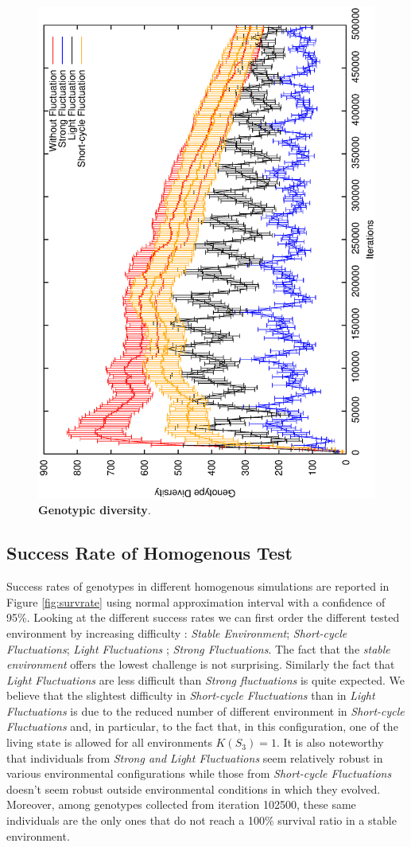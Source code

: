 \begin{figure}[h]
\centering
\includegraphics[width=0.7\columnwidth, angle =-90 ]{img/GenoDiversity}
\caption{\textbf{Genotypic diversity}.}
\label{fig:genodiv}
\end{figure}

\subsection{Success Rate of Homogenous Test}
Success rates of genotypes in different homogenous simulations are reported in Figure \ref{fig:survrate} using normal approximation interval with a confidence of 95\%. Looking at the different success rates we can first order the different tested environment by increasing difficulty : \emph{Stable Environment}; \emph{Short-cycle Fluctuations}; \emph{Light Fluctuations} ; \emph{Strong Fluctuations}. The fact that the \emph{stable environment} offers the lowest challenge is not surprising. Similarly the fact that \emph{Light Fluctuations} are less difficult than \emph{Strong fluctuations} is quite expected. We believe that the slightest difficulty in \emph{Short-cycle Fluctuations} than in \emph{Light Fluctuations} is due to the reduced number of different environment in \emph{Short-cycle Fluctuations} and, in particular, to the fact that, in this configuration, one of the living state is allowed for all environments $K(S_3)=1$. It is also noteworthy that individuals from \emph{Strong and Light Fluctuations} seem relatively robust in various environmental configurations while those from \emph{Short-cycle Fluctuations} doesn't seem robust outside environmental conditions in which they evolved. Moreover, among genotypes collected from iteration 102500, these same individuals are the only ones that do not reach a 100\% survival ratio in a stable environment.


